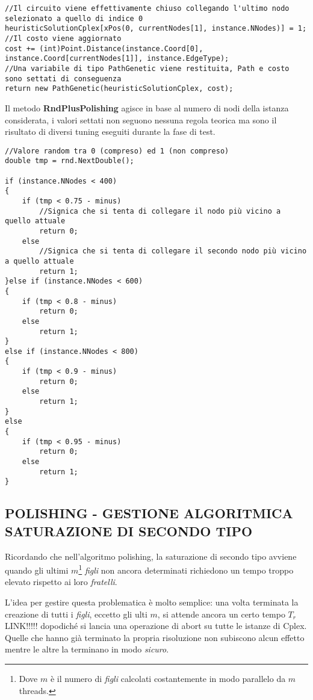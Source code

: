 \documentclass[11pt]{article}
\begin{document}
\begin{lstlisting}
//Il circuito viene effettivamente chiuso collegando l'ultimo nodo selezionato a quello di indice 0
heuristicSolutionCplex[xPos(0, currentNodes[1], instance.NNodes)] = 1;
//Il costo viene aggiornato
cost += (int)Point.Distance(instance.Coord[0], instance.Coord[currentNodes[1]], instance.EdgeType);
//Una variabile di tipo PathGenetic viene restituita, Path e costo sono settati di conseguenza
return new PathGenetic(heuristicSolutionCplex, cost);

\end{lstlisting}

Il metodo \textbf{RndPlusPolishing} agisce in base al numero di nodi della istanza considerata, i valori settati non seguono nessuna regola teorica ma sono il risultato di diversi tuning eseguiti durante la fase di test.

\begin{lstlisting}
//Valore random tra 0 (compreso) ed 1 (non compreso)
double tmp = rnd.NextDouble();

if (instance.NNodes < 400)
{
    if (tmp < 0.75 - minus)
        //Signica che si tenta di collegare il nodo più vicino a quello attuale
        return 0;
    else
        //Signica che si tenta di collegare il secondo nodo più vicino a quello attuale
        return 1;
}else if (instance.NNodes < 600)
{
    if (tmp < 0.8 - minus)
        return 0;
    else
        return 1;
}
else if (instance.NNodes < 800)
{
    if (tmp < 0.9 - minus)
        return 0;
    else
        return 1;
}
else
{
    if (tmp < 0.95 - minus)
        return 0;
    else
        return 1;
}

\end{lstlisting}

\subsection*{POLISHING - GESTIONE ALGORITMICA SATURAZIONE DI SECONDO TIPO}
\label{sec:PolishingSatDueS}

Ricordando che nell'algoritmo polishing, la saturazione di secondo tipo avviene quando gli ultimi $m$\footnote{Dove $m$ è il numero di \textit{figli} calcolati costantemente in modo parallelo da $m$ threads.} \textit{figli} non ancora determinati richiedono un tempo troppo elevato rispetto ai loro \textit{fratelli}.

L'idea per gestire questa problematica è molto semplice: una volta terminata la creazione di tutti i \textit{figli}, eccetto gli ulti $m$, si attende ancora un certo tempo $T_r$ LINK!!!!! dopodiché si lancia una operazione di abort su tutte le istanze di Cplex. Quelle che hanno già terminato la propria risoluzione non subiscono alcun effetto mentre le altre la terminano in modo \textit{sicuro}.
\end{document}
